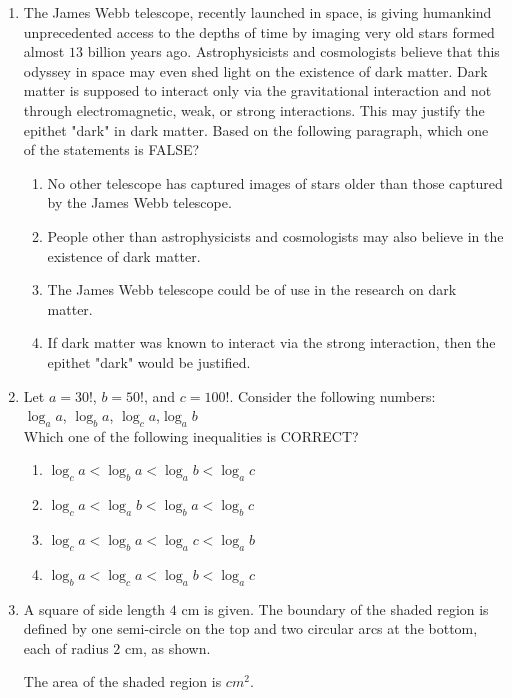 \documentclass[journal,12pt,onecolumn]{IEEEtran}
\theoremstyle{remark}
\begin{document}
\begin{enumerate}
    \item The James Webb telescope, recently launched in space, is giving humankind unprecedented access to the depths of time by imaging very old stars formed almost $13$ billion years ago. Astrophysicists and cosmologists believe that this odyssey in space may even shed light on the existence of dark matter. Dark matter is supposed to interact only via the gravitational interaction and not through electromagnetic, weak, or strong interactions. This may justify the epithet "dark" in dark matter.
     Based on the following paragraph, which one of the statements is FALSE? 
    \begin{enumerate}
        \item No other telescope has captured images of stars older than those captured by the James Webb telescope.
        \item People other than astrophysicists and cosmologists may also believe in the existence of dark matter.
        \item The James Webb telescope could be of use in the research on dark matter.
        \item If dark matter was known to interact via the strong interaction, then the epithet "dark" would be justified.
    \end{enumerate}
    \item Let $a = 30!$, $b = 50!$, and $c = 100!$. Consider the following numbers:\\ 
    $\log_a a$, $\log_b a$, $\log_c a$,$\log_a b$\\
    Which one of the following inequalities is CORRECT?
    \begin{enumerate}
        \item $\log_c a < \log_b a < \log_a b < \log_a c$
        \item $\log_c a < \log_a b < \log_b a < \log_b c$
        \item $\log_c a < \log_b a < \log_a c < \log_a b$
        \item $\log_b a < \log_c a < \log_a b < \log_a c$
    \end{enumerate}
    \item A square of side length $4$ cm is given. The boundary of the shaded region is defined by one semi-circle on the top and two circular arcs at the bottom, each of radius $2$ cm, as shown.
      \begin{figure}[H]
        \centering
          
    \end{figure}
    The area of the shaded region is {\underline{\hspace{2cm}}}$cm^2$.

\end{enumerate}
\end{document}
